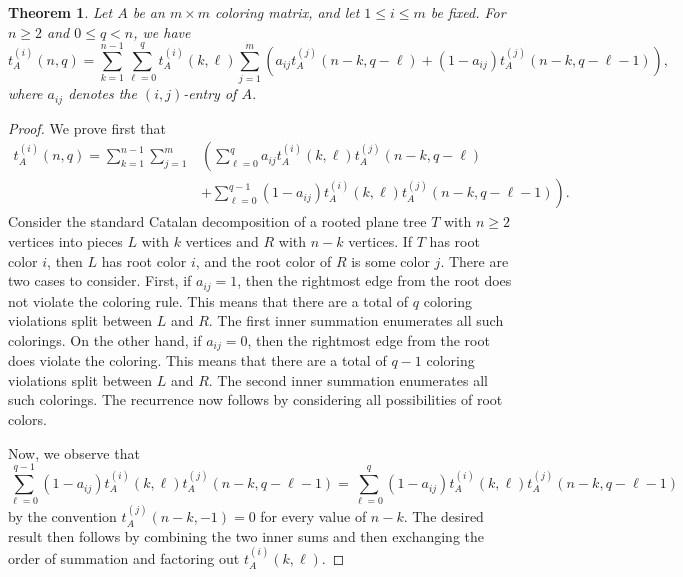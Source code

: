 \documentclass[12pt]{amsart}
\newtheorem{theorem}{Theorem}
\begin{document}
\begin{theorem}\label{prop:rootrecgeneral}
    Let $A$ be an $m\times m$ coloring matrix, and let $1\leq i\leq m$ be fixed. For $n\geq2$ and $0\leq q<n$, we have
    \[
    t_A^{(i)}(n,q)=\sum_{k=1}^{n-1}\sum_{\ell=0}^qt_A^{(i)}(k,\ell)\sum_{j=1}^m\left(a_{ij}t_A^{(j)}(n-k,q-\ell)+(1-a_{ij})t_A^{(j)}(n-k,q-\ell-1)\right),
    \]
    where $a_{ij}$ denotes the $(i,j)$-entry of $A$.
\end{theorem}
\begin{proof}
    We prove first that
    \begin{align*}
        t_A^{(i)}(n,q)=\sum_{k=1}^{n-1}\sum_{j=1}^m&\left(\sum_{\ell=0}^qa_{ij}t_A^{(i)}(k,\ell)t_A^{(j)}(n-k,q-\ell)\right.\\&+\left.\sum_{\ell=0}^{q-1}(1-a_{ij})t_A^{(i)}(k,\ell)t_A^{(j)}(n-k,q-\ell-1)\right).
    \end{align*}
    Consider the standard Catalan decomposition of a rooted plane tree $T$ with $n\geq 2$ vertices into pieces $L$ with $k$ vertices and $R$ with $n-k$ vertices. 
    If $T$ has root color $i$, then $L$ has root color $i$, and the root color of $R$ is some color $j$. There are two cases to consider. First, if $a_{ij}=1$, then the rightmost edge from the root does not violate the coloring rule. This means that there are a total of $q$ coloring violations split between $L$ and $R$. The first inner summation enumerates all such colorings. On the other hand, if $a_{ij}=0$, then the rightmost edge from the root does violate the coloring. This means that there are a total of $q-1$ coloring violations split between $L$ and $R$. The second inner summation enumerates all such colorings.
    The recurrence now follows by considering all possibilities of root colors.

    Now, we observe that
    \[
    \sum_{\ell=0}^{q-1}(1-a_{ij})t_A^{(i)}(k,\ell)t_A^{(j)}(n-k,q-\ell-1)=\sum_{\ell=0}^{q}(1-a_{ij})t_A^{(i)}(k,\ell)t_A^{(j)}(n-k,q-\ell-1)
    \]
    by the convention $t_A^{(j)}(n-k,-1)=0$ for every value of $n-k$. The desired result then follows by combining the two inner sums and then exchanging the order of summation and factoring out $t_A^{(i)}(k,\ell)$.
\end{proof}
\end{document}
